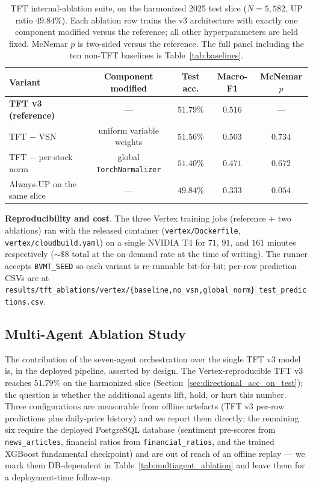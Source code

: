 \documentclass[conference]{IEEEtran}
\begin{document}
\begin{table}[htbp]
\centering
\caption{TFT internal-ablation suite, on the harmonized 2025 test slice ($N=5{,}582$, UP ratio $49.84\%$). Each ablation row trains the v3 architecture with exactly one component modified versus the reference; all other hyperparameters are held fixed. McNemar $p$ is two-sided versus the reference. The full panel including the ten non-TFT baselines is Table~\ref{tab:baselines}.}
\label{tab:tft_ablations}
\scriptsize
\setlength{\tabcolsep}{4pt}
\begin{tabular}{lcccc}
\toprule
\textbf{Variant} & \textbf{Component modified} & \textbf{Test acc.} & \textbf{Macro-F1} & \textbf{McNemar $p$} \\
\midrule
\textbf{TFT v3 (reference)}   & ---                                       & $\mathbf{51.79\%}$ & $\mathbf{0.516}$ & ---     \\
TFT $-$ VSN                   & uniform variable weights                  & $51.56\%$ & $0.503$ & $0.734$ \\
TFT $-$ per-stock norm        & global \texttt{TorchNormalizer}           & $51.40\%$ & $0.471$ & $0.672$ \\
\midrule
Always-UP on the same slice   & ---                                       & $49.84\%$ & $0.333$ & $0.054$ \\
\bottomrule
\end{tabular}
\normalsize
\end{table}

\textbf{Reproducibility and cost}. The three Vertex training jobs (reference $+$ two ablations) ran with the released container (\texttt{vertex/Dockerfile}, \texttt{vertex/cloudbuild.yaml}) on a single NVIDIA T4 for $71$, $91$, and $161$ minutes respectively ($\sim\!\$8$ total at the on-demand rate at the time of writing). The runner accepts \texttt{BVMT\_SEED} so each variant is re-runnable bit-for-bit; per-row prediction CSVs are at \texttt{results/tft\_ablations/vertex/\{baseline,no\_vsn,global\_norm\}\_test\_predictions.csv}.

\subsection{Multi-Agent Ablation Study}\label{sec:multiagent_ablation}

The contribution of the seven-agent orchestration over the single TFT v3 model is, in the deployed pipeline, asserted by design. The Vertex-reproducible TFT v3 reaches $51.79\%$ on the harmonized slice (Section~\ref{sec:directional_acc_on_test}); the question is whether the additional agents lift, hold, or hurt this number. Three configurations are measurable from offline artefacts (TFT v3 per-row predictions plus daily-price history) and we report them directly; the remaining six require the deployed PostgreSQL database (sentiment pre-scores from \texttt{news\_articles}, financial ratios from \texttt{financial\_ratios}, and the trained XGBoost fundamental checkpoint) and are out of reach of an offline replay --- we mark them DB-dependent in Table~\ref{tab:multiagent_ablation} and leave them for a deployment-time follow-up.
\end{document}
